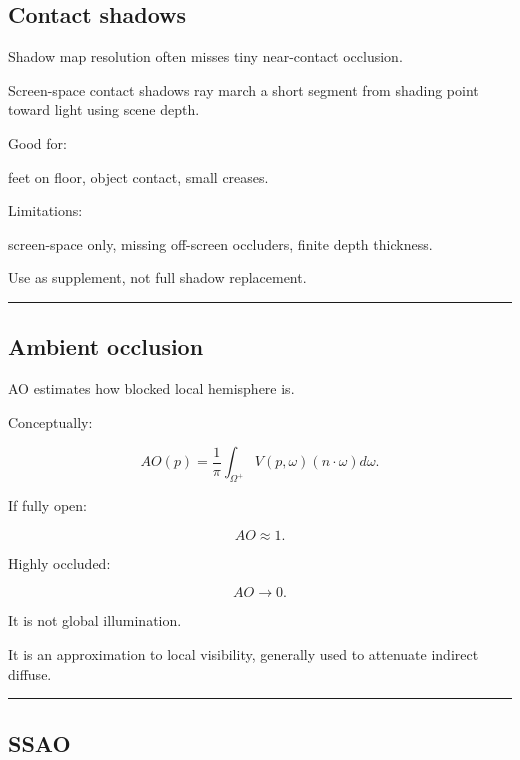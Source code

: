\subsection{Contact shadows}\label{04-visual-computing-ii-ch040-contact-shadows}

\hypertarget{04-visual-computing-ii-ch040-contact-shadows}{}

Shadow map resolution often misses tiny near-contact occlusion.

Screen-space contact shadows ray march a short segment from shading point toward light using scene depth.

Good for:

feet on floor, object contact, small creases.

Limitations:

screen-space only, missing off-screen occluders, finite depth thickness.

Use as supplement, not full shadow replacement.

\begin{center}\rule{0.5\linewidth}{0.5pt}\end{center}

\subsection{Ambient occlusion}\label{04-visual-computing-ii-ch040-ambient-occlusion}

\hypertarget{04-visual-computing-ii-ch040-ambient-occlusion}{}

AO estimates how blocked local hemisphere is.

Conceptually:

\[
\boxed{
AO(p)
=
\frac1\pi
\int_{\Omega^+}
V(p,\omega)
(n\cdot\omega)
d\omega.
}
\]

If fully open:

\[
AO\approx1.
\]

Highly occluded:

\[
AO\rightarrow0.
\]

It is not global illumination.

It is an approximation to local visibility, generally used to attenuate indirect diffuse.

\begin{center}\rule{0.5\linewidth}{0.5pt}\end{center}

\subsection{SSAO}\label{04-visual-computing-ii-ch040-ssao}

